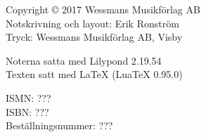 \pagestyle{empty}
\tinyskip
\vfill
\begin{flushleft}
\small{
Copyright \copyright{} 2017 Wessmans Musikförlag AB \\
Notskrivning och layout: Erik Ronström \\
Tryck: Wessmans Musikförlag AB, Visby

\vspace{3mm}

Noterna satta med Lilypond 2.19.54 \\
Texten satt med \LaTeX{} (LuaTeX 0.95.0)

\vspace{3mm}

ISMN: ??? \\
ISBN: ??? \\
Beställningsnummer: ???
}
\end{flushleft}

